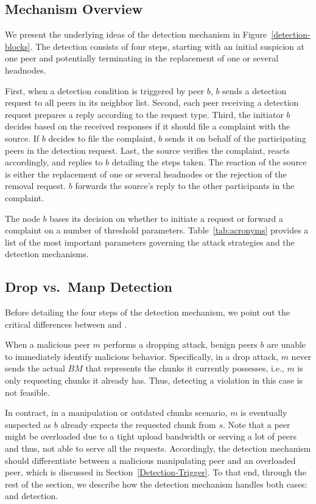 \subsection{Mechanism Overview}
We present the underlying ideas of the detection mechanism in Figure~\ref{detection-blocks}.
The detection consists of four steps, starting with an initial suspicion at one peer and potentially terminating in the replacement of one or several headnodes. 

First, when a detection condition is triggered by peer $b$, $b$ sends a detection request to all peers in its neighbor list.
Second, each peer receiving a detection request prepares a reply according to the request type.
Third, the initiator $b$ decides based on the received responses if it should file a complaint with the source.
If $b$ decides to file the complaint, $b$ sends it on behalf of the participating peers in the detection request. 
Last, the source verifies the complaint, reacts accordingly, and replies to $b$ detailing the steps taken. 
The reaction of the source is either the replacement of one or several headnodes or the rejection of the removal request.
 $b$ forwards the source's reply to the other participants in the complaint.

The node $b$ bases its decision on whether to initiate a request or forward a complaint on a number of threshold
parameters. Table~\ref{tab:acronyms} provides a list of the most important parameters governing the attack strategies and
the detection mechanisms. 


\subsection{Drop vs.\ Manp Detection}
Before detailing the four steps of the detection mechanism, we point out the critical differences between \drop and \manp.

When a malicious peer $m$ performs a dropping attack, benign peers $b$ are unable to immediately identify malicious behavior.
Specifically, in a drop attack, $m$ never sends the actual $BM$ that represents the chunks it currently possesses, i.e., $m$ is only requesting chunks it already has.
Thus, detecting a violation in this case is not feasible. 

In contract, in a manipulation or outdated chunks scenario, $m$ is eventually suspected as $b$ already expects the requested chunk from $s$.
Note that a peer might be overloaded due to a tight upload bandwidth or serving a lot of peers and thus, not able to serve all the requests.
Accordingly, the detection mechanism should differentiate between a malicious manipulating peer and an overloaded peer, which is discussed in Section~\ref{Detection-Trigger}.
To that end, through the rest of the section, we describe how the detection mechanism handles both cases: \drop and \manp detection.

